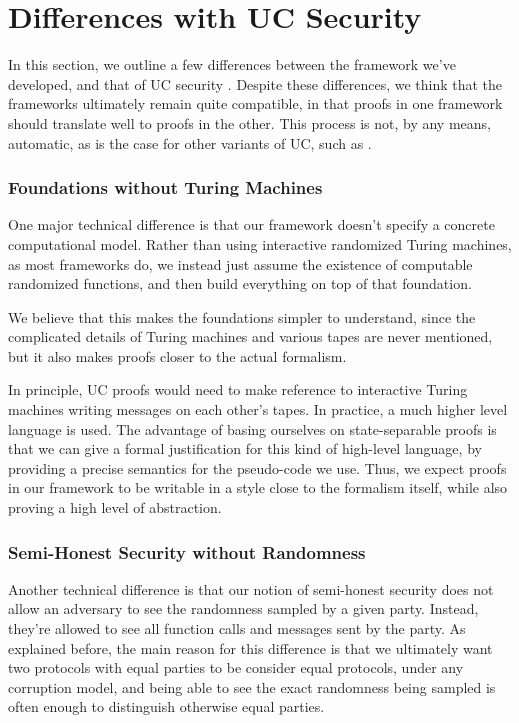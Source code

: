 \section{Differences with UC Security}

In this section, we outline a few differences between
the framework we've developed, and that of UC security
\cite{EPRINT:Canetti00}.
Despite these differences, we think that the frameworks
ultimately remain quite compatible, 
in that proofs in one framework should translate well
to proofs in the other.
This process is not, by any means, automatic,
as is the case for other variants of UC,
such as \cite{C:CanCohLin15}.

\subsubsection*{Foundations without Turing Machines}

One major technical difference is that our framework
doesn't specify a concrete computational model.
Rather than using interactive randomized Turing machines,
as most frameworks do, we instead just
assume the existence of computable randomized functions,
and then build everything on top of that foundation.

We believe that this makes the foundations simpler to understand,
since the complicated details of Turing machines and various
tapes are never mentioned, but it also
makes proofs closer to the actual formalism.

In principle, UC proofs would need to make reference
to interactive Turing machines writing messages on each other's
tapes.
In practice, a much higher level language is used.
The advantage of basing ourselves on state-separable proofs
is that we can give a formal justification for this kind
of high-level language, by providing a precise semantics
for the pseudo-code we use.
Thus, we expect proofs in our framework to be writable
in a style close to the formalism itself,
while also proving a high level of abstraction.

\subsubsection*{Semi-Honest Security without Randomness}

Another technical difference is that our notion of semi-honest
security does not allow an adversary to see the randomness
sampled by a given party.
Instead, they're allowed to see all function calls
and messages sent by the party.
As explained before, the main reason for this difference
is that we ultimately want two protocols
with equal parties to be consider equal protocols,
under any corruption model, and being able to see the
exact randomness being sampled is often enough to distinguish
otherwise equal parties.

